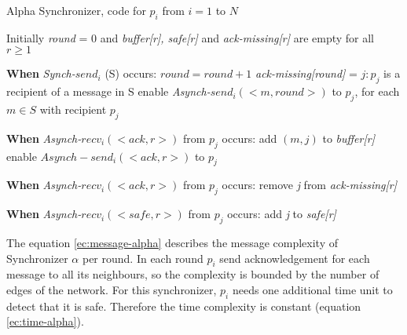 \begin{algorithm}
 \caption{Alpha Synchronizer, code for $p_i$ from $i = 1$ to $N$}
 \label{algorithm:alpha} 

\SetAlgoNoLine

Initially \textit{round} = 0 and \newline
\textit{buffer[r], safe[r]} and \textit{ack-missing[r]} are empty for all $r \geq 1$ \newline

\textbf{When} \textit{Synch-}$send_i$ (S) occurs:\newline
$round = round + 1$ \newline
\textit{ack-missing[round]} = {$j:p_j$ is a recipient of a message in S} \newline
enable \textit{Asynch-}$send_i(<m,round>)$  to $p_j$, for each $m \in S$ with recipient $p_j$ \newline

\textbf{When} \textit{Asynch-}$recv_i(<ack,r>)$ from $p_j$ occurs: \newline
add $(m,j)$ to \textit{buffer[r]} \newline
enable $Asynch-send_i(<ack,r>)$ to $p_j$ \newline

\textbf{When} \textit{Asynch-}$recv_i(<ack,r>)$ from $p_j$ occurs: \newline
remove \textit{j} from \textit{ack-missing[r]} \newline
{}

\textbf{When} \textit{Asynch-}$recv_i(<safe,r>)$ from $p_j$ occurs: \newline
add \textit{j} to \textit{safe[r]} \newline
{}

\end{algorithm}

The equation \ref{ec:message-alpha} describes the message complexity of Synchronizer $\alpha$ per round. In each round $p_i$ send acknowledgement for each message to all its neighbours, so the complexity is bounded by the number of edges of the network. For this synchronizer, $p_i$ needs one additional time unit to detect that it is safe. Therefore the time complexity is constant (equation \ref{ec:time-alpha}).  

